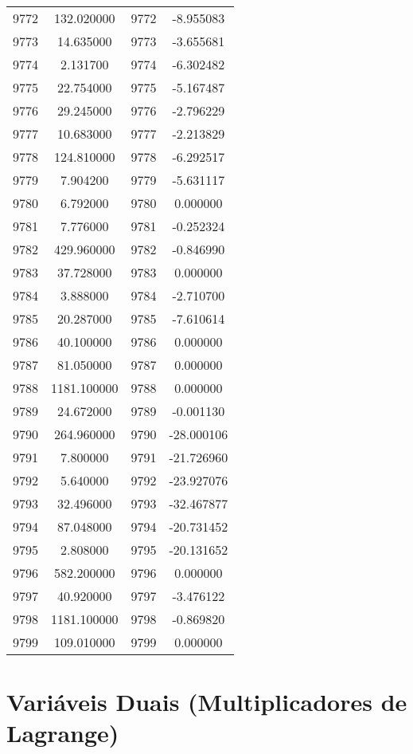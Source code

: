 \documentclass[12pt]{article}
\begin{document}
\begin{longtable}{@{}cccc@{}}
9772 & 132.020000 & 9772 & -8.955083 \\
9773 & 14.635000 & 9773 & -3.655681 \\
9774 & 2.131700 & 9774 & -6.302482 \\
9775 & 22.754000 & 9775 & -5.167487 \\
9776 & 29.245000 & 9776 & -2.796229 \\
9777 & 10.683000 & 9777 & -2.213829 \\
9778 & 124.810000 & 9778 & -6.292517 \\
9779 & 7.904200 & 9779 & -5.631117 \\
9780 & 6.792000 & 9780 & 0.000000 \\
9781 & 7.776000 & 9781 & -0.252324 \\
9782 & 429.960000 & 9782 & -0.846990 \\
9783 & 37.728000 & 9783 & 0.000000 \\
9784 & 3.888000 & 9784 & -2.710700 \\
9785 & 20.287000 & 9785 & -7.610614 \\
9786 & 40.100000 & 9786 & 0.000000 \\
9787 & 81.050000 & 9787 & 0.000000 \\
9788 & 1181.100000 & 9788 & 0.000000 \\
9789 & 24.672000 & 9789 & -0.001130 \\
9790 & 264.960000 & 9790 & -28.000106 \\
9791 & 7.800000 & 9791 & -21.726960 \\
9792 & 5.640000 & 9792 & -23.927076 \\
9793 & 32.496000 & 9793 & -32.467877 \\
9794 & 87.048000 & 9794 & -20.731452 \\
9795 & 2.808000 & 9795 & -20.131652 \\
9796 & 582.200000 & 9796 & 0.000000 \\
9797 & 40.920000 & 9797 & -3.476122 \\
9798 & 1181.100000 & 9798 & -0.869820 \\
9799 & 109.010000 & 9799 & 0.000000 \\

\end{longtable}

\section{Variáveis Duais (Multiplicadores de Lagrange)}
\end{document}

